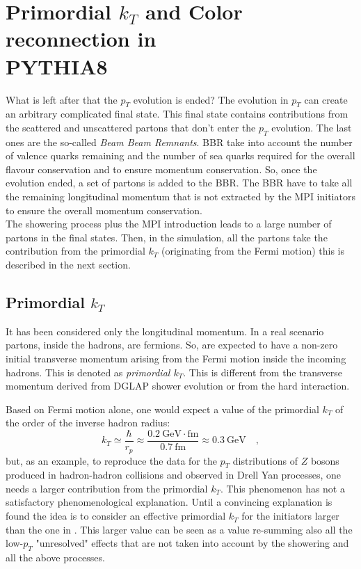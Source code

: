 \section{Primordial $k_T$ and Color reconnection in\\ \mbox{PYTHIA8}}
\label{sec:Beam Beam Remnants and primordial kT}

What is left after that the $p_T$ evolution is ended?
The evolution in $p_T$ can create an arbitrary complicated final state. 
This final state contains contributions from the scattered and unscattered partons that don't enter the $p_T$ evolution. The last ones are the so-called \textit{Beam Beam Remnants}. 
BBR take into account the number of valence quarks remaining and the number of sea quarks required for the overall flavour conservation and to ensure momentum conservation. So, once the evolution ended, a set of partons is added to the BBR. The BBR have to take all the remaining longitudinal momentum that is not extracted by the MPI initiators to ensure the overall momentum conservation.
\\
The showering process plus the MPI introduction leads to a large number of partons in the final states. Then, in the simulation, all the partons take the contribution from the primordial $k_T$ (originating from the Fermi motion) this is described in the next section.    

\subsection*{Primordial $k_T$}

It has been considered only the longitudinal momentum. In a real scenario partons, inside the hadrons, are fermions. So, are expected to have a non-zero initial transverse momentum arising from the Fermi motion inside the incoming hadrons. This is denoted as \textit{primordial $k_T$}. This is different from the transverse momentum derived from DGLAP shower evolution or from the hard interaction. 

\bigskip

\noindent Based on Fermi motion alone, one would expect a value of the primordial $k_T$ of the order of the inverse hadron radius: 
\begin{equation}
	k_T\simeq\frac{\hbar}{r_p}\approx\frac{0.2\ \mathrm{GeV\cdot fm}}{0.7\ \mathrm{fm}}\approx0.3\ \mathrm{GeV}\quad,
\label{eq:PrimordialKT}
\end{equation}
but, as an example, to reproduce the data for the $p_T$ distributions of $Z$ bosons produced in hadron-hadron collisions and observed in Drell Yan processes, one needs a larger contribution from the primordial $k_T$. This phenomenon has not a satisfactory phenomenological explanation. Until a convincing explanation is found the idea is to consider an effective primordial $k_T$ for the initiators larger than the one in . This larger value can be seen as a value re-summing also all the low-$p_T$ "unresolved" effects that are not taken into account by the showering and all the above processes.  

